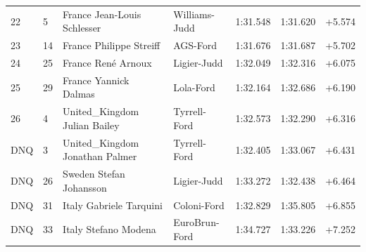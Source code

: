 \documentclass{article}
\begin{document}
\begin{tabular}{lllllll}
22 & 5 & France Jean-Louis Schlesser & Williams-Judd & 1:31.548 & 1:31.620 & +5.574 \\
23 & 14 & France Philippe Streiff & AGS-Ford & 1:31.676 & 1:31.687 & +5.702 \\
24 & 25 & France René Arnoux & Ligier-Judd & 1:32.049 & 1:32.316 & +6.075 \\
25 & 29 & France Yannick Dalmas & Lola-Ford & 1:32.164 & 1:32.686 & +6.190 \\
26 & 4 & United\_Kingdom Julian Bailey & Tyrrell-Ford & 1:32.573 & 1:32.290 & +6.316 \\
DNQ & 3 & United\_Kingdom Jonathan Palmer & Tyrrell-Ford & 1:32.405 & 1:33.067 & +6.431 \\
DNQ & 26 & Sweden Stefan Johansson & Ligier-Judd & 1:33.272 & 1:32.438 & +6.464 \\
DNQ & 31 & Italy Gabriele Tarquini & Coloni-Ford & 1:32.829 & 1:35.805 & +6.855 \\
DNQ & 33 & Italy Stefano Modena & EuroBrun-Ford & 1:34.727 & 1:33.226 & +7.252 \\
\bottomrule
\end{tabular}
\end{document}
